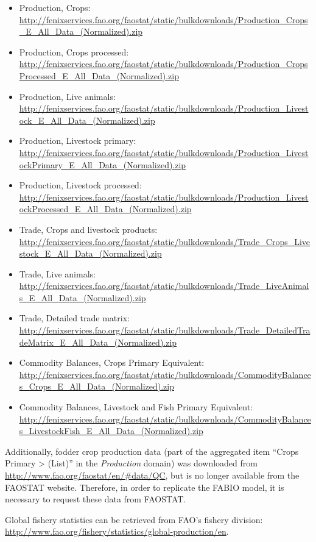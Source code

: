 \documentclass[]{article}
\begin{document}
\begin{itemize}
\item
  Production, Crops:
  \url{http://fenixservices.fao.org/faostat/static/bulkdownloads/Production_Crops_E_All_Data_(Normalized).zip}
\item
  Production, Crops processed:
  \url{http://fenixservices.fao.org/faostat/static/bulkdownloads/Production_CropsProcessed_E_All_Data_(Normalized).zip}
\item
  Production, Live animals:
  \url{http://fenixservices.fao.org/faostat/static/bulkdownloads/Production_Livestock_E_All_Data_(Normalized).zip}
\item
  Production, Livestock primary:
  \url{http://fenixservices.fao.org/faostat/static/bulkdownloads/Production_LivestockPrimary_E_All_Data_(Normalized).zip}
\item
  Production, Livestock processed:
  \url{http://fenixservices.fao.org/faostat/static/bulkdownloads/Production_LivestockProcessed_E_All_Data_(Normalized).zip}
\item
  Trade, Crops and livestock products:
  \url{http://fenixservices.fao.org/faostat/static/bulkdownloads/Trade_Crops_Livestock_E_All_Data_(Normalized).zip}
\item
  Trade, Live animals:
  \url{http://fenixservices.fao.org/faostat/static/bulkdownloads/Trade_LiveAnimals_E_All_Data_(Normalized).zip}
\item
  Trade, Detailed trade matrix:
  \url{http://fenixservices.fao.org/faostat/static/bulkdownloads/Trade_DetailedTradeMatrix_E_All_Data_(Normalized).zip}
\item
  Commodity Balances, Crops Primary Equivalent:
  \url{http://fenixservices.fao.org/faostat/static/bulkdownloads/CommodityBalances_Crops_E_All_Data_(Normalized).zip}
\item
  Commodity Balances, Livestock and Fish Primary Equivalent:
  \url{http://fenixservices.fao.org/faostat/static/bulkdownloads/CommodityBalances_LivestockFish_E_All_Data_(Normalized).zip}
\end{itemize}

Additionally, fodder crop production data (part of the aggregated item
``Crops Primary \textgreater{} (List)'' in the \emph{Production} domain)
was downloaded from \url{http://www.fao.org/faostat/en/\#data/QC}, but
is no longer available from the FAOSTAT website. Therefore, in order to
replicate the FABIO model, it is necessary to request these data from
FAOSTAT.

Global fishery statistics can be retrieved from FAO's fishery division:
\url{http://www.fao.org/fishery/statistics/global-production/en}.
\end{document}
